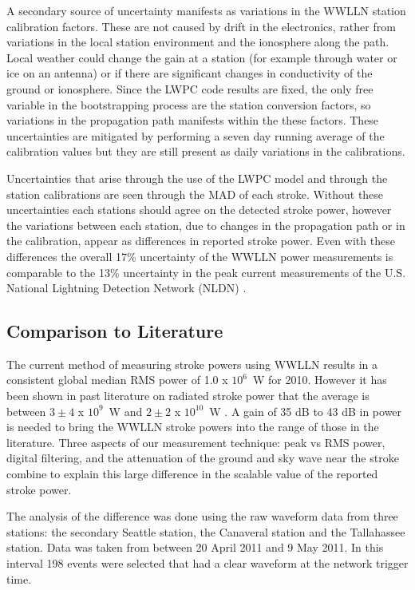 A secondary source of uncertainty manifests as variations in the WWLLN station calibration factors.
These are not caused by drift in the electronics, rather from variations in the local station environment and the ionosphere along the path.
Local weather could change the gain at a station (for example through water or ice on an antenna) or if there are significant changes in conductivity of the ground or ionosphere.
Since the LWPC code results are fixed, the only free variable in the bootstrapping process are the station conversion factors, so variations in the propagation path manifests within the these factors.
These uncertainties are mitigated by performing a seven day running average of the calibration values but they are still present as daily variations in the calibrations.

Uncertainties that arise through the use of the LWPC model and through the station calibrations are seen through the MAD of each stroke.
Without these uncertainties each stations should agree on the detected stroke power, however the variations between each station, due to changes in the propagation path or in the calibration, appear as differences in reported stroke power.
Even with these differences the overall 17\% uncertainty of the WWLLN power measurements is comparable to the 13\% uncertainty in the peak current measurements of the U.S. National Lightning Detection Network (NLDN) \citep{Nag2011}.

\subsection{Comparison to Literature}

The current method of measuring stroke powers using WWLLN results in a consistent global median RMS power of 1.0 x $10^6$~W for 2010.
However it has been shown in past literature on radiated stroke power that the average is between $3\pm4$ x $10^9$~W and  $2\pm2$ x $10^{10}$~W \citep{Krider1983}.
A gain of 35 dB to 43 dB in power is needed to bring the WWLLN stroke powers into the range of those in the literature.
Three aspects of our measurement technique: peak vs RMS power, digital filtering, and the attenuation of the ground and sky wave near the stroke combine to explain this large difference in the scalable value of the reported stroke power.

The analysis of the difference was done using the raw waveform data from three stations: the secondary Seattle station, the Canaveral station and the Tallahassee station.
Data was taken from between 20 April 2011 and 9 May 2011. In this interval 198 events were selected that had a clear waveform at the network trigger time.

